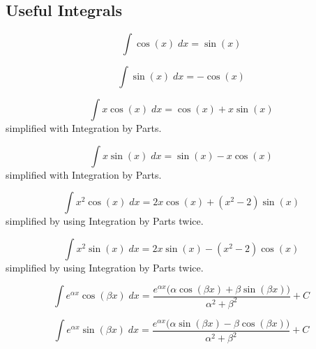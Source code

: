 \subsection{Useful Integrals}\label{subsec:Useful_Integrals}
\begin{equation}\label{eq:Cosine_Indefinite_Integral}
  \int \cos(x) \; dx = \sin(x)
\end{equation}

\begin{equation}\label{eq:Sine_Indefinite_Integral}
  \int \sin(x) \; dx = -\cos(x)
\end{equation}

\begin{equation}\label{eq:x_Cosine_Indefinite_Integral}
  \int x \cos(x) \; dx = \cos(x) + x \sin(x)
\end{equation}
 simplified with Integration by Parts.

\begin{equation}\label{eq:x_Sine_Indefinite_Integral}
  \int x \sin(x) \; dx = \sin(x) - x \cos(x)
\end{equation}
 simplified with Integration by Parts.

\begin{equation}\label{eq:x_Squared_Cosine_Indefinite_Integral}
  \int x^{2} \cos(x) \; dx = 2x \cos(x) + (x^{2} - 2) \sin(x)
\end{equation}
 simplified by using Integration by Parts twice.

\begin{equation}\label{eq:x_Squared_Sine_Indefinite_Integral}
  \int x^{2} \sin(x) \; dx = 2x \sin(x) - (x^{2} - 2) \cos(x)
\end{equation}
 simplified by using Integration by Parts twice.

\begin{equation}\label{eq:Exponential_Cosine_Indefinite_Integral}
  \int e^{\alpha x} \cos(\beta x) \; dx = \frac{e^{\alpha x} \bigl( \alpha \cos(\beta x) + \beta \sin(\beta x) \bigr)}{\alpha^{2} + \beta^{2}} + C
\end{equation}

\begin{equation}\label{eq:Exponential_Sine_Indefinite_Integral}
  \int e^{\alpha x} \sin(\beta x) \; dx = \frac{e^{\alpha x} \bigl( \alpha \sin(\beta x) - \beta \cos(\beta x) \bigr)}{\alpha^{2}+\beta^{2}} + C
\end{equation}


